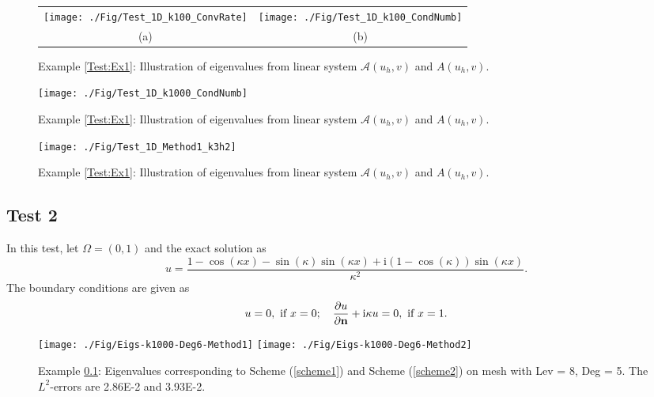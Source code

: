 \documentclass[preprint,11pt]{elsarticle}
\newcommand{\bn}{{\bf n}}
\def\bn{{\bf n}}
\begin{document}
\begin{figure}[H]
\centering
\begin{tabular}{cc}
\texttt{[image: ./Fig/Test\_1D\_k100\_ConvRate]}
&\texttt{[image: ./Fig/Test\_1D\_k100\_CondNumb]}\\
(a) & (b)
\end{tabular}
\caption{Example \ref{Test:Ex1}: Illustration of eigenvalues from linear system $\mathcal{A}(u_h,v)$ and ${A}(u_h,v)$.}\label{Fig:Ex1-ConRate}
\end{figure}

\begin{figure}[H]
\centering
\texttt{[image: ./Fig/Test\_1D\_k1000\_CondNumb]}
\caption{Example \ref{Test:Ex1}: Illustration of eigenvalues from linear system $\mathcal{A}(u_h,v)$ and ${A}(u_h,v)$.}\label{Fig:Ex1-1000}
\end{figure}





\begin{figure}[H]
\centering
\texttt{[image: ./Fig/Test\_1D\_Method1\_k3h2]}
\caption{Example \ref{Test:Ex1}: Illustration of eigenvalues from linear system $\mathcal{A}(u_h,v)$ and ${A}(u_h,v)$.}\label{Fig:Ex1-k3h2}
\end{figure}

\subsection{Test 2}\label{Test:Ex2}
In this test, let $\Omega = (0,1)$ and the exact solution as 
$$u = \frac{1-\cos(\kappa x)-\sin(\kappa)\sin(\kappa x)+\text{i}(1-\cos(\kappa))\sin(\kappa x)}{\kappa^2}.$$
The boundary conditions are given as
\begin{eqnarray*}
u = 0, \text{ if }x=0; \quad \frac{\partial u}{\partial\bn}+\text{i}\kappa u = 0, \text{ if }x=1.
\end{eqnarray*}

\begin{figure}[H]
\centering
\texttt{[image: ./Fig/Eigs-k1000-Deg6-Method1]}
\texttt{[image: ./Fig/Eigs-k1000-Deg6-Method2]}
\caption{Example \ref{Test:Ex2}: Eigenvalues corresponding to Scheme (\ref{scheme1}) and Scheme (\ref{scheme2}) on mesh with Lev = 8, Deg = 5. The $L^2$-errors are 2.86E-2 and 3.93E-2.}%
\end{figure}
\end{document}
